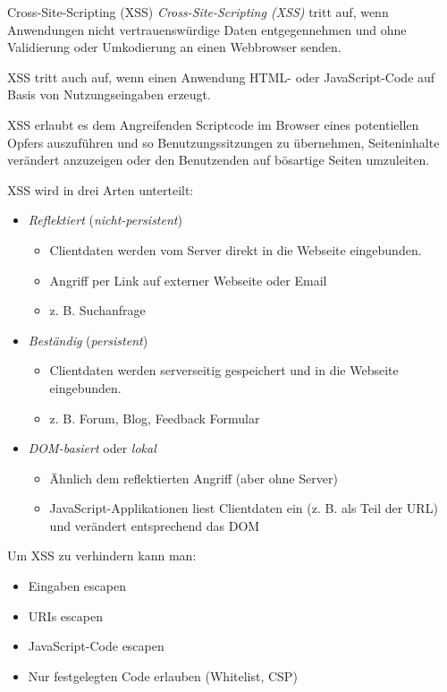 \begin{defi}{Cross-Site-Scripting (XSS)}
    \emph{Cross-Site-Scripting (XSS)} tritt auf, wenn Anwendungen nicht vertrauenswürdige Daten entgegennehmen und ohne Validierung oder Umkodierung an einen Webbrowser senden.

    XSS tritt auch auf, wenn einen Anwendung HTML- oder JavaScript-Code auf Basis von Nutzungseingaben erzeugt.

    XSS erlaubt es dem Angreifenden Scriptcode im Browser eines potentiellen Opfers auszuführen und so Benutzungssitzungen zu übernehmen, Seiteninhalte verändert anzuzeigen oder den Benutzenden auf bösartige Seiten umzuleiten.

    XSS wird in drei Arten unterteilt:
    \begin{itemize}
        \item \emph{Reflektiert} (\emph{nicht-persistent})
              \begin{itemize}
                  \item Clientdaten werden vom Server direkt in die Webseite eingebunden.
                  \item Angriff per Link auf externer Webseite oder Email
                  \item z. B. Suchanfrage
              \end{itemize}
        \item \emph{Beständig} (\emph{persistent})
              \begin{itemize}
                  \item Clientdaten werden serverseitig gespeichert und in die Webseite eingebunden.
                  \item z. B. Forum, Blog, Feedback Formular
              \end{itemize}
        \item \emph{DOM-basiert} oder \emph{lokal}
              \begin{itemize}
                  \item Ähnlich dem reflektierten Angriff (aber ohne Server)
                  \item JavaScript-Applikationen liest Clientdaten ein (z. B. als Teil der URL) und verändert entsprechend das DOM
              \end{itemize}
    \end{itemize}

    Um XSS zu verhindern kann man:
    \begin{itemize}
        \item Eingaben escapen
        \item URIs escapen
        \item JavaScript-Code escapen
        \item Nur festgelegten Code erlauben (Whitelist, CSP)
    \end{itemize}
\end{defi}

